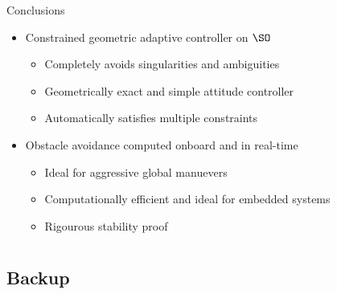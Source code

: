 \documentclass[11pt,professionalfonts]{beamer}
\begin{document}
\begin{frame}{Conclusions} %

	\begin{itemize}
		\item Constrained geometric adaptive controller on \( \SO \)
		\begin{itemize}
			\item Completely avoids singularities and ambiguities 
			\item Geometrically exact and simple attitude controller
			\item Automatically satisfies multiple constraints 
		\end{itemize}
		\pause
		\item Obstacle avoidance computed onboard and in real-time
		\begin{itemize}
			\item Ideal for aggressive global manuevers
			\item Computationally efficient and ideal for embedded systems 
			\item Rigourous stability proof 
		\end{itemize}
	\end{itemize}

\end{frame}   %

\section*{}
\subsection*{Backup}
\end{document}
